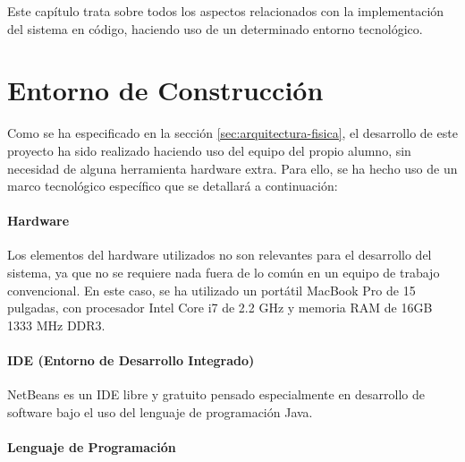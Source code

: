 

Este capí­tulo trata sobre todos los aspectos relacionados con la implementación del sistema en código, haciendo uso de un determinado entorno tecnológico.

\section{Entorno de Construcción}\label{sec:entorno-construcción}

Como se ha especificado en la sección \ref{sec:arquitectura-fisica}, el desarrollo de este proyecto ha sido realizado haciendo uso del equipo del propio alumno, sin necesidad de alguna herramienta hardware extra. Para ello, se ha hecho uso de un marco tecnológico específico que se detallará a continuación: 

\paragraph*{Hardware}

Los elementos del hardware utilizados no son relevantes para el desarrollo del sistema, ya que no se requiere nada fuera de lo común en un equipo de trabajo convencional. En este caso, se ha utilizado un portátil MacBook Pro de 15 pulgadas, con procesador Intel Core i7 de 2.2 GHz y memoria RAM de 16GB 1333 MHz DDR3.

\paragraph*{IDE (Entorno de Desarrollo Integrado)}

NetBeans es un IDE libre y gratuito pensado especialmente en desarrollo de software bajo el uso del lenguaje de programación Java.

\paragraph*{Lenguaje de Programación} 

